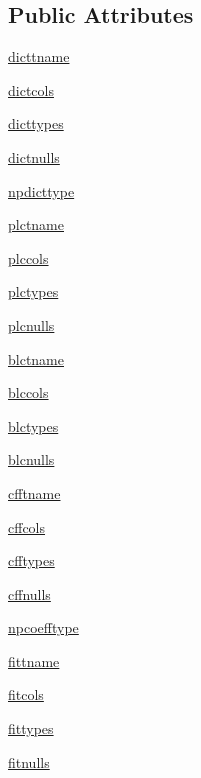\subsection*{Public Attributes}
\begin{DoxyCompactItemize}
\item 
\hyperlink{classdbconfig_1_1Asas_a74b79111c0b825aada21837b4a2f63bb}{dicttname}
\item 
\hyperlink{classdbconfig_1_1Asas_a958ec28dacb03d1a14fd64e421ac6b1b}{dictcols}
\item 
\hyperlink{classdbconfig_1_1Asas_a27e982b8fa2de97613508d0f107282d0}{dicttypes}
\item 
\hyperlink{classdbconfig_1_1Asas_a785517b6dab415832015ead9bdc8ae99}{dictnulls}
\item 
\hyperlink{classdbconfig_1_1Asas_a667b865b313be2e037560d499190fae4}{npdicttype}
\item 
\hyperlink{classdbconfig_1_1Asas_af0b83fddb33f1e798d3cddf763152d87}{plctname}
\item 
\hyperlink{classdbconfig_1_1Asas_a439c8b0f83ee3f5ef8d26f32840e7b69}{plccols}
\item 
\hyperlink{classdbconfig_1_1Asas_aa821e57805b77ad50a15f22e06071bd8}{plctypes}
\item 
\hyperlink{classdbconfig_1_1Asas_a2cb6b082447d67be6147132ee3ed3a25}{plcnulls}
\item 
\hyperlink{classdbconfig_1_1Asas_ab5d570a3ba8d7ef7ad341da3ddcc20b6}{blctname}
\item 
\hyperlink{classdbconfig_1_1Asas_add840af9cc3776023edb5eec97d6bfff}{blccols}
\item 
\hyperlink{classdbconfig_1_1Asas_afbbc02c9c3a6058bb8d6ab9d28893a04}{blctypes}
\item 
\hyperlink{classdbconfig_1_1Asas_aea4e19d941bd17055de19be0cf1fc456}{blcnulls}
\item 
\hyperlink{classdbconfig_1_1Asas_af505566f2b829c8cc8a8398f971c3732}{cfftname}
\item 
\hyperlink{classdbconfig_1_1Asas_acacc892581d6c4e5b9a25c89246bd009}{cffcols}
\item 
\hyperlink{classdbconfig_1_1Asas_a9ad045c204ed1efab5a2068aaa2c6203}{cfftypes}
\item 
\hyperlink{classdbconfig_1_1Asas_a359ddb7363a0d9927d889ad9332988ab}{cffnulls}
\item 
\hyperlink{classdbconfig_1_1Asas_a3d190a817a3a3d81dbd560732dc14529}{npcoefftype}
\item 
\hyperlink{classdbconfig_1_1Asas_a6323effc0231480580e3feb140ee39cf}{fittname}
\item 
\hyperlink{classdbconfig_1_1Asas_a0557c33edf7f4d42fce873fd7114c65c}{fitcols}
\item 
\hyperlink{classdbconfig_1_1Asas_a996f14f6a823b9220977c7f2fc38f806}{fittypes}
\item 
\hyperlink{classdbconfig_1_1Asas_a71d563b5bc83e8999e1eb21fffa83ed5}{fitnulls}
\end{DoxyCompactItemize}



